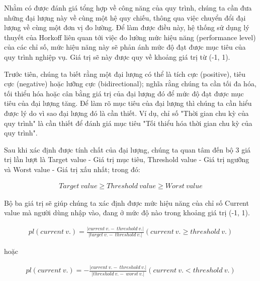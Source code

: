 Nhằm có được đánh giá tổng hợp về công năng của quy trình, chúng ta cần đưa những đại lượng này về cùng một hệ quy chiếu, thông qua việc chuyển đổi đại lượng về cùng một đơn vị đo lường. Để làm được điều này, hệ thống sử dụng lý thuyết của Horkoff liên quan tới việc đo lường mức hiệu năng (performance level) của các chỉ số, mức hiệu năng này sẽ phản ánh mức độ đạt được mục tiêu của quy trình nghiệp vụ. Giá trị sẽ này được quy về khoảng giá trị từ (-1, 1).

Trước tiên, chúng ta biết rằng một đại lượng có thể là tích cực (positive), tiêu cực (negative) hoặc lưỡng cực (bidirectional); nghĩa rằng chúng ta cần tối đa hóa, tối thiểu hóa hoặc cân bằng giá trị của đại lượng đó để mức độ đạt được mục tiêu của đại lượng tăng. Để làm rõ mục tiêu của đại lượng thì chúng ta cần hiểu được lý do vì sao đại lượng đó là cần thiết. Ví dụ, chỉ số "Thời gian chu kỳ của quy trình" là cần thiết để đánh giá mục tiêu "Tối thiểu hóa thời gian chu kỳ của quy trình".

Sau khi xác định được tính chất của đại lượng, chúng ta quan tâm đến bộ 3 giá trị lần lượt là Target value - Giá trị mục tiêu, Threshold value - Giá trị ngưỡng và Worst value - Giá trị xấu nhất; trong đó:

\begin{align}
      Target{\ }value \geq Threshold{\ }value \geq Worst{\ }value
\end{align}

Bộ ba giá trị sẽ giúp chúng ta xác định được mức hiệu năng của chỉ số Current value mà người dùng nhập vào, đang ở mức độ nào trong khoảng giá trị (-1, 1).

\begin{align}
      pl(current{\ }v.) = \frac{\left| current{\ }v. -{\ }threshold{\ }v.\right|}{\left| target{\ }v. -{\ }threshold{\ }v. \right|} (current {\ }v.\geq  threshold{\ }v.)
\end{align}

hoặc

\begin{align}
      pl(current{\ }v.) = - \frac{\left| current{\ }v. -{\ }threshold{\ }v.\right|}{\left| threshold{\ }v. -{\ }worst{\ }v. \right|} (current {\ }v. <  threshold{\ }v.)
\end{align}